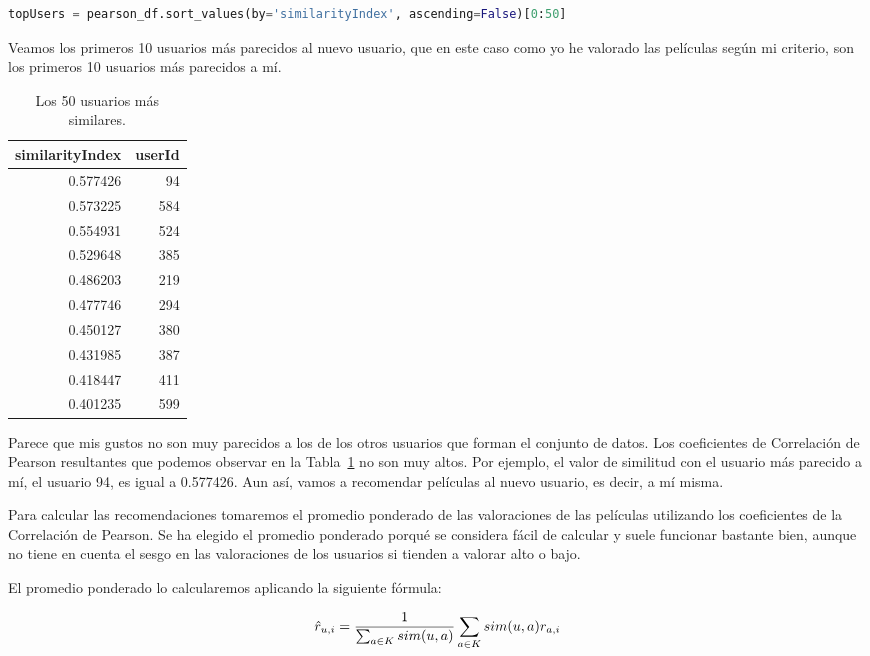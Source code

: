 \documentclass{uimppracticas}
\begin{document}
\begin{lstlisting}[language=python, basicstyle=\small]
topUsers = pearson_df.sort_values(by='similarityIndex', ascending=False)[0:50]
\end{lstlisting}

Veamos los primeros 10 usuarios más parecidos al nuevo usuario, que en este caso como yo he valorado las películas según mi criterio, son los primeros 10 usuarios más parecidos a mí.

\begin{table}[h]
	\centering
	\begin{tabular}{rr}
		\toprule
		similarityIndex &  userId \\
		\midrule
		0.577426 &      94 \\
		0.573225 &     584 \\
		0.554931 &     524 \\
		0.529648 &     385 \\
		0.486203 &     219 \\
		0.477746 &     294 \\
		0.450127 &     380 \\
		0.431985 &     387 \\
		0.418447 &     411 \\
		0.401235 &     599 \\
		\bottomrule
	\end{tabular}
	\caption{Los 50 usuarios más similares.}
	\label{top_50}
\end{table}

Parece que mis gustos no son muy parecidos a los de los otros usuarios que forman el conjunto de datos. Los coeficientes de Correlación de Pearson resultantes que podemos observar en la Tabla~\ref{top_50} no son muy altos. Por ejemplo, el valor de similitud con el usuario más parecido a mí, el usuario 94, es igual a 0.577426. Aun así, vamos a recomendar películas al nuevo usuario, es decir, a mí misma.

Para calcular las recomendaciones tomaremos el promedio ponderado de las valoraciones de las películas utilizando los coeficientes de la Correlación de Pearson. Se ha elegido el promedio ponderado porqué se considera fácil de calcular y suele funcionar bastante bien, aunque no tiene en cuenta el sesgo en las valoraciones de los usuarios si tienden a valorar alto o bajo. 

El promedio ponderado lo calcularemos aplicando la siguiente fórmula:

\begin{equation}\label{promedio_ponderado}
	\large \hat{r}_{u,i} = \frac{1}{\sum_{a\in K}sim(u,a)} \sum_{a\in K }sim(u,a) r_{a,i}
\end{equation}
\end{document}
